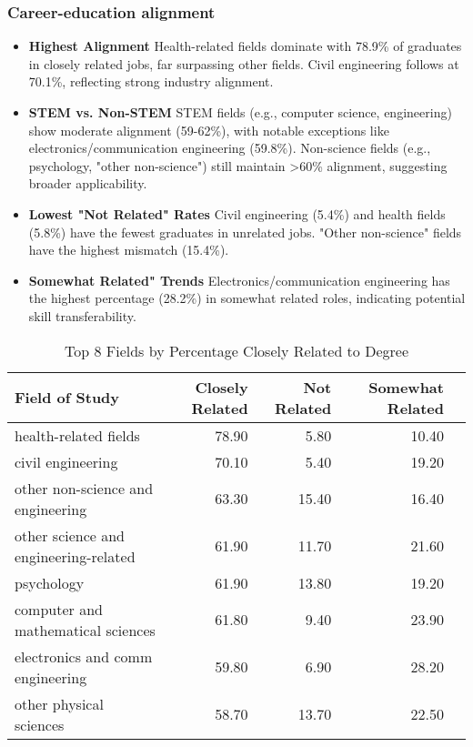 \documentclass[12pt]{article}
\begin{document}
\subsubsection {Career-education alignment }
\begin{itemize}
    \item \textbf{Highest Alignment}
    Health-related fields dominate with 78.9\% of graduates in closely related jobs, far surpassing other fields.
    Civil engineering follows at 70.1\%, reflecting strong industry alignment.
    \item \textbf{STEM vs. Non-STEM}     STEM fields (e.g., computer science, engineering) show moderate alignment (59-62\%), with notable exceptions like electronics/communication engineering (59.8\%).
    Non-science fields (e.g., psychology, "other non-science") still maintain >60\% alignment, suggesting broader applicability.
    \item \textbf{Lowest "Not Related" Rates}     Civil engineering (5.4\%) and health fields (5.8\%) have the fewest graduates in unrelated jobs.
    "Other non-science" fields have the highest mismatch (15.4\%).
    \item \textbf{Somewhat Related" Trends} Electronics/communication engineering has the highest percentage (28.2\%) in somewhat related roles, indicating potential skill transferability.
\end{itemize}

\begin{table}[ht]
\centering
\begin{tabular}{|l|r|r|r|r|}
  \toprule
  \hline
Field of Study & Closely Related & Not Related & Somewhat Related \\ \hline
  \midrule
  health-related fields & 78.90 & 5.80 & 10.40 \\ \hline
  civil engineering & 70.10 & 5.40 & 19.20   \\ \hline
  other non-science and engineering & 63.30 & 15.40 & 16.40  \\ \hline
  other science and engineering-related & 61.90 & 11.70 & 21.60  \\ \hline
  psychology & 61.90 & 13.80 & 19.20  \\ \hline
  computer and mathematical sciences & 61.80 & 9.40 & 23.90  \\ \hline
  electronics and comm engineering & 59.80 & 6.90 & 28.20   \\ \hline
  other physical sciences & 58.70 & 13.70 & 22.50  \\ \hline
   \bottomrule
\end{tabular}
\caption{Top 8 Fields by Percentage Closely Related to Degree} 
\label{tab:top8alignment}
\end{table}
\end{document}
